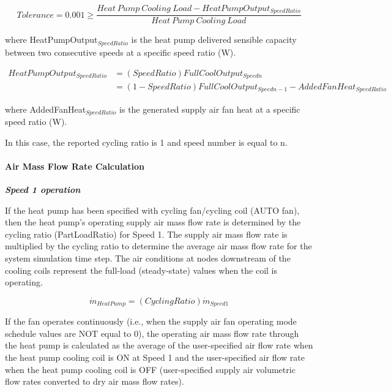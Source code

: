 \begin{equation}
Tolerance = 0.001 \ge \frac{{Heat~Pump~Cooling~Load - HeatPumpOutpu{t_{SpeedRatio}}}}{{Heat~Pump~Cooling~Load}}
\end{equation}

where HeatPumpOutput\(_{SpeedRatio}\) is the heat pump delivered sensible capacity between two consecutive speeds at a specific speed ratio (W).

\begin{equation}
\begin{array}{rl}
HeatPumpOutpu{t_{SpeedRatio}} & = (SpeedRatio)FullCoolOutpu{t_{Speedn}} \\
 & = (1 - SpeedRatio)FullCoolOutpu{t_{Speedn-1}} - AddedFanHea{t_{SpeedRatio}}
\end{array}
\end{equation}

where AddedFanHeat\(_{SpeedRatio}\) is the generated supply air fan heat at a specific speed ratio (W).

In this case, the reported cycling ratio is 1 and speed number is equal to n.

\paragraph{Air Mass Flow Rate Calculation}\label{air-mass-flow-rate-calculation-2}

\emph{\textbf{Speed 1 operation}}

If the heat pump has been specified with cycling fan/cycling coil (AUTO fan), then the heat pump's operating supply air mass flow rate is determined by the cycling ratio (PartLoadRatio) for Speed 1. The supply air mass flow rate is multiplied by the cycling ratio to determine the average air mass flow rate for the system simulation time step. The air conditions at nodes downstream of the cooling coils represent the full-load (steady-state) values when the coil is operating.

\begin{equation}
{\dot m_{HeatPump}} = (CyclingRatio){\dot m_{Speed1}}
\end{equation}

If the fan operates continuously (i.e., when the supply air fan operating mode schedule values are NOT equal to 0), the operating air mass flow rate through the heat pump is calculated as the average of the user-specified air flow rate when the heat pump cooling coil is ON at Speed 1 and the user-specified air flow rate when the heat pump cooling coil is OFF (user-specified supply air volumetric flow rates converted to dry air mass flow rates).

